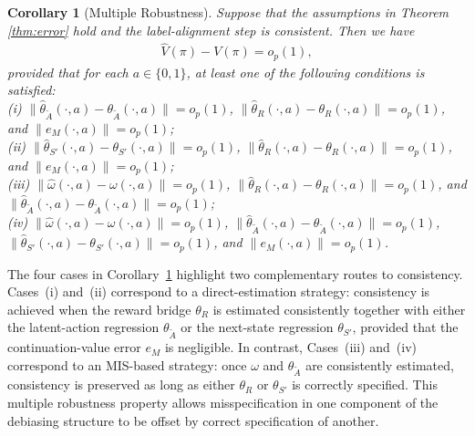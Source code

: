 \documentclass[12pt]{article}
\newcommand{\0}{\boldsymbol{0}}
\newtheorem{corollary}{Corollary}
\begin{document}
\begin{corollary}[Multiple Robustness] \label{cor: multiple robust}
Suppose that the assumptions in Theorem \ref{thm:error} hold and the label-alignment step is consistent.
Then we have \begin{gather*}
    \widehat V(\pi) - V(\pi) = o_p(1),
\end{gather*} provided that for each \(a\in\{0,1\}\), at least one of the following conditions is satisfied:\\
    (i) \(\| \widehat\theta_{\widetilde A}(\cdot,a)- \theta_{\widetilde A}(\cdot,a)\|=o_p(1)\), \(\| \widehat\theta_{R}(\cdot,a)- \theta_{R}(\cdot,a)\|=o_p(1)\),
and \(\|e_M(\cdot,a)\|=o_p(1)\);\\
    (ii) \(\| \widehat\theta_{S'}(\cdot,a)- \theta_{S'}(\cdot,a)\|=o_p(1)\), \(\| \widehat\theta_{R}(\cdot,a)- \theta_{R}(\cdot,a)\|=o_p(1)\),
and \(\|e_M(\cdot,a)\|=o_p(1)\);\\
    (iii) \(\| \widehat\omega(\cdot,a)- \omega(\cdot,a)\|=o_p(1)\), \(\| \widehat\theta_{R}(\cdot,a)- \theta_{R}(\cdot,a)\|=o_p(1)\), and \(\| \widehat\theta_{\widetilde A}(\cdot,a)- \theta_{\widetilde A}(\cdot,a)\|=o_p(1)\);\\
    (iv) \(\| \widehat\omega(\cdot,a)- \omega(\cdot,a)\|=o_p(1)\), \(\| \widehat\theta_{\widetilde A}(\cdot,a)- \theta_{\widetilde A}(\cdot,a)\|=o_p(1)\), \(\| \widehat\theta_{S'}(\cdot,a)- \theta_{S'}(\cdot,a)\|=o_p(1)\), and \(\|e_M(\cdot,a)\|=o_p(1)\).
\end{corollary}



The four cases in Corollary~\ref{cor: multiple robust} highlight two complementary routes to consistency. Cases~(i) and~(ii) correspond to a direct-estimation strategy: consistency is achieved when the reward bridge $\theta_R$ is estimated consistently together with either the latent-action regression $\theta_{\widetilde A}$ or the next-state regression $\theta_{S'}$, provided that the continuation-value error $e_M$ is negligible. In contrast, Cases~(iii) and~(iv) correspond to an MIS-based strategy: once $\omega$ and $\theta_{\widetilde A}$ are consistently estimated, consistency is preserved as long as either $\theta_R$ or $\theta_{S'}$ is correctly specified. This multiple robustness property allows misspecification in one component of the debiasing structure to be offset by correct specification of another.
\end{document}
